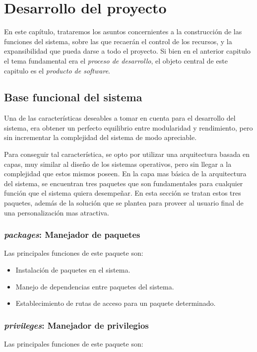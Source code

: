 \chapter{Desarrollo del proyecto}

En este capítulo, trataremos los asuntos concernientes a la construcción de las
funciones del sistema, sobre las que recaerán el control de los recursos, y la
expansibilidad que pueda darse a todo el proyecto. Si bien en el anterior
capitulo el tema fundamental era el \emph{proceso de desarrollo}, el objeto
central de este capitulo es el \emph{producto de software}.

\section{Base funcional del sistema}
Una de las características deseables a tomar en cuenta para el desarrollo del
sistema, era obtener un perfecto equilibrio entre modularidad y rendimiento,
pero sin incrementar la complejidad del sistema de modo apreciable.

Para conseguir tal característica, se opto por utilizar una arquitectura basada
en capas, muy similar al diseño de los sistemas operativos, pero sin llegar a la
complejidad que estos mismos poseen. En la capa mas básica de la arquitectura
del sistema, se encuentran tres paquetes que son fundamentales para cualquier
función que el sistema quiera desempeñar. En esta sección se tratan estos tres
paquetes, además de la solución que se plantea para proveer al usuario final de
una personalización mas atractiva.

\subsection{\emph{packages}: Manejador de paquetes}
Las principales funciones de este paquete son:

\begin{itemize}
\item Instalación de paquetes en el sistema.
\item Manejo de dependencias entre paquetes del sistema.
\item Establecimiento de rutas de acceso para un paquete determinado.
\end{itemize}

\subsection{\emph{privileges}: Manejador de privilegios}
Las principales funciones de este paquete son:

